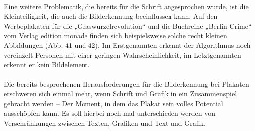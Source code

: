 \documentclass[a4paper,12pt,ngerman]{article}
\begin{document}
\\
Eine weitere Problematik, die bereits für die Schrift angesprochen wurde, ist die Kleinteiligkeit, die auch die Bilderkennung beeinflussen kann. Auf den Werbeplakaten für die „Graswurzelrevolution“ und die Buchreihe „Berlin Crime“ vom Verlag edition monade finden sich beispielsweise solche recht kleinen Abbildungen (Abb. 41 und 42). Im Erstgenannten erkennt der Algorithmus noch vereinzelt Personen mit einer geringen Wahrscheinlichkeit, im Letztgenannten erkennt er kein Bildelement. \\
\\
Die bereits besprochenen Herausforderungen für die Bilderkennung bei Plakaten erschweren sich einmal mehr, wenn Schrift und Grafik in ein Zusammenspiel gebracht werden -- Der Moment, in dem das Plakat sein volles Potential ausschöpfen kann. Es soll hierbei noch mal unterschieden werden von Verschränkungen zwischen Texten, Grafiken und Text und Grafik. \\
\end{document}
